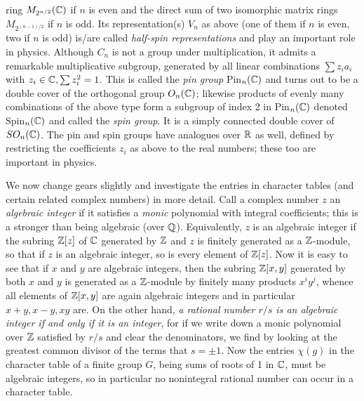 \documentclass[10pt]{article}
\begin{document}
ring $M_{2^{n/2}}(\Bbb C)$ if $n$ is even and the direct sum of two
isomorphic matrix rings $M_{2^{(n-1)/2}}$ if $n$ is odd. Its
representation(s) $V_n$ as above (one of them if $n$ is even, two if $n$
is odd) is/are called {\sl half-spin representations} and play an
important role in physics. Although $C_n$ is not a group under
multiplication, it admits a remarkable multiplicative subgroup,
generated by all linear combinations $\sum z_i a_i$ with $z_i\in\Bbb
C,\sum z_i^2 = 1$. This is called the {\sl pin group} Pin$_n(\Bbb C)$
and turns out to be a double cover of the orthogonal group $O_n(\Bbb
C)$; likewise products of evenly many combinations of the above type
form a subgroup of index 2 in Pin$_n(\Bbb C)$ denoted Spin$_n(\Bbb C)$
and called the {\sl spin group}. It is a simply connected double cover
of $SO_n(\Bbb C)$. The pin and spin groups have analogues over $\Bbb R$
as well, defined by restricting the coefficients $z_i$ as above to the
real numbers; these too are important in physics.

We now change gears slightly and investigate the entries in character
tables (and certain related complex numbers) in more detail. Call a
complex number $z$ an {\sl algebraic integer} if it satisfies a {\sl
  monic} polynomial with integral coefficients; this is a stronger than
being algebraic (over $\Bbb Q$). Equivalently, $z$ is an algebraic
integer if the subring $\Bbb Z[z]$ of $\Bbb C$ generated by $\Bbb Z$ and
$z$ is finitely generated as a $\Bbb Z$-module, so that if $z$ is an
algebraic integer, so is every element of $\Bbb Z[z]$. Now it is easy to
see that if $x$ and $y$ are algebraic integers, then the subring $\Bbb
Z[x,y]$ generated by both $x$ and $y$ is generated as a $\Bbb Z$-module
by finitely many products $x^i y^j$, whence all elements of $\Bbb
Z[x,y]$ are again algebraic integers and in particular $x+y,x-y,xy$ are.
On the other hand, {\sl a rational number $r/s$ is an algebraic integer
  if and only if it is an integer}, for if we write down a monic
polynomial over $\Bbb Z$ satisfied by $r/s$ and clear the denominators,
we find by looking at the greatest common divisor of the terms that
$s=\pm1$. Now the entries $\chi(g)$ in the character table of a finite
group $G$, being sums of roots of 1 in $\Bbb C$, must be algebraic
integers, so in particular no nonintegral rational number can occur in a
character table.
\end{document}
